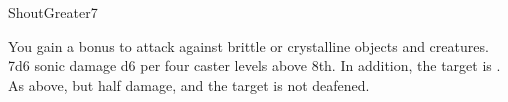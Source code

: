 \begin{spellsection}{Shout}{Greater}{7}
\begin{spellheader}
    \begin{spelltargetinginfo}
    \end{spelltargetinginfo}
\end{spellheader}
\begin{spellcontent}
    \begin{spelleffects}
        \spellspecial You gain a  bonus to attack against brittle or crystalline objects and creatures.
        \spellsuccess 7d6 sonic damage \add d6 per four caster levels above 8th. In addition, the target is \deafened.
        \spellfailure As above, but half damage, and the target is not deafened.
    \end{spelleffects}
\end{spellcontent}
\begin{spellfooter}
\end{spellfooter}
\end{spellsection}

